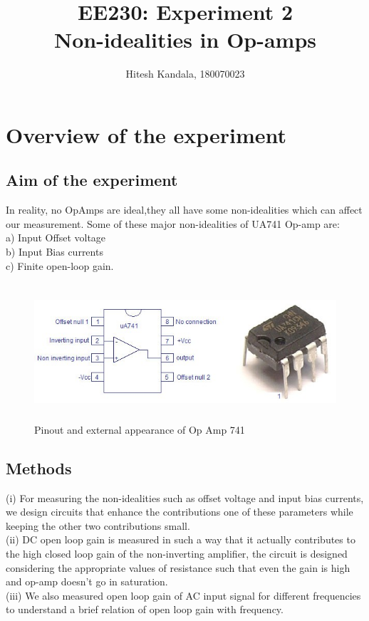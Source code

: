 \documentclass[12pt]{article}
\title{EE230: Experiment 2\\
Non-idealities in Op-amps}
\author{Hitesh Kandala, 180070023}
\begin{document}
\maketitle

\section{Overview of the experiment}

\subsection{Aim of the experiment}

In reality, no OpAmps are ideal,they all have some non-idealities which can affect our measurement. Some of these major non-idealities of UA741 Op-amp are:\\ a) Input Offset voltage \\ b) Input Bias currents \\ c) Finite open-loop gain.

\begin{figure}[H]
    \centering
    \includegraphics[width = \linewidth, height = 2in]{uA741-pinout.jpg}
    \caption{Pinout and external appearance of Op Amp 741}
\end{figure}

\subsection{Methods}

(i) For measuring the non-idealities such as offset voltage and input bias currents, we design circuits that enhance the contributions one of these parameters while keeping the other two contributions small.
\\
(ii) DC open loop gain is measured in such a way that it actually contributes to the high closed loop gain of the non-inverting amplifier, the circuit is designed considering the appropriate values of resistance such that even the gain is high and op-amp doesn't go in saturation.
\\
(iii) We also measured open loop gain of AC input signal for different frequencies to understand a brief relation of open loop gain with frequency.
\end{document}
